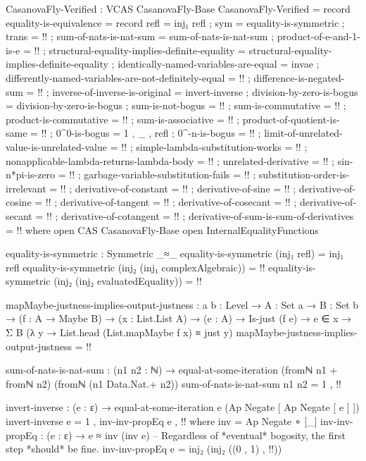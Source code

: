 \documentclass{report}
\begin{document}
\begin{code}
CasanovaFly-Verified : VCAS CasanovaFly-Base
CasanovaFly-Verified = record
  { equality-is-equivalence = record
    { refl = inj₁ refl
    ; sym = equality-is-symmetric
    ; trans = {!!}
    }
  ; sum-of-nats-is-nat-sum = sum-of-nats-is-nat-sum
  ; product-of-e-and-1-is-e = {!!}
  ; structural-equality-implies-definite-equality =
    structural-equality-implies-definite-equality
  ; identically-named-variables-are-equal = invae
  ; differently-named-variables-are-not-definitely-equal = {!!}
  ; difference-is-negated-sum = {!!}
  ; inverse-of-inverse-is-original = invert-inverse
  ; division-by-zero-is-bogus = division-by-zero-is-bogus
  ; sum-is-not-bogus = {!!}
  ; sum-is-commutative = {!!}
  ; product-is-commutative = {!!}
  ; sum-is-associative = {!!}
  ; product-of-quotient-is-same = {!!}
  ; 0^0-is-bogus = 1 , _ , refl
  ; 0^-n-is-bogus = {!!}
  ; limit-of-unrelated-value-is-unrelated-value = {!!}
  ; simple-lambda-substitution-works = {!!}
  ; nonapplicable-lambda-returns-lambda-body = {!!}
  ; unrelated-derivative = {!!}
  ; sin-n*pi-is-zero = {!!}
  ; garbage-variable-substitution-fails = {!!}
  ; substitution-order-is-irrelevant = {!!}
  ; derivative-of-constant = {!!}
  ; derivative-of-sine = {!!}
  ; derivative-of-cosine = {!!}
  ; derivative-of-tangent = {!!}
  ; derivative-of-cosecant = {!!}
  ; derivative-of-secant = {!!}
  ; derivative-of-cotangent = {!!}
  ; derivative-of-sum-is-sum-of-derivatives = {!!}
  }
  where
  open CAS CasanovaFly-Base
  open InternalEqualityFunctions

  equality-is-symmetric : Symmetric _≈_
  equality-is-symmetric (inj₁ refl) = inj₁ refl
  equality-is-symmetric (inj₂ (inj₁ complexAlgebraic)) = {!!}
  equality-is-symmetric (inj₂ (inj₂ evaluatedEquality)) = {!!}

  mapMaybe-justness-implies-output-justness :
    {a b : Level} →
    {A : Set a} →
    {B : Set b} →
    (f : A → Maybe B) →
    (x : List.List A) →
    (e : A) →
    Is-just (f e) →
    e ∈ x →
    Σ B (λ y → List.head (List.mapMaybe f x) ≡ just y)
  mapMaybe-justness-implies-output-justness = {!!}

  sum-of-nats-is-nat-sum :
    (n1 n2 : ℕ) →
    equal-at-some-iteration (fromℕ n1 + fromℕ n2) (fromℕ (n1 Data.Nat.+ n2))
  sum-of-nats-is-nat-sum n1 n2 = 1 , {!!}

  invert-inverse : (e : ε) → equal-at-some-iteration e (Ap Negate [ Ap Negate [ e ] ])
  invert-inverse e = 1 , inv-inv-propEq e , {!!}
    where
    inv = Ap Negate ∘ [_]
    inv-inv-propEq :
      (e : ε) →
      e ≈ inv (inv e)
    -- Regardless of *eventual* bogosity, the first step *should* be fine.
    inv-inv-propEq e = inj₂ (inj₂ ((0 , 1) ,  {!!}))


\end{code}
\end{document}
